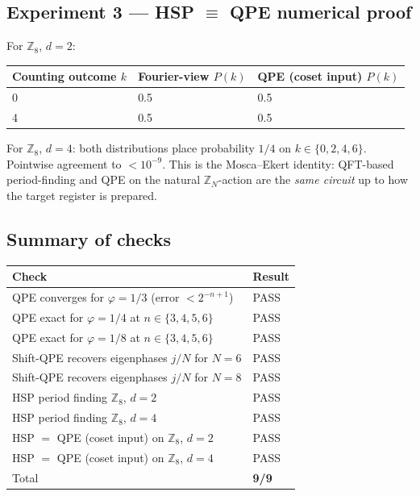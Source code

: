 \documentclass[11pt]{article}
\begin{document}
\subsection{Experiment 3 --- HSP $\equiv$ QPE numerical proof}

For $\mathbb{Z}_8$, $d=2$:
\begin{center}
\begin{tabular}{lll}
\toprule
Counting outcome $k$ & Fourier-view $P(k)$ & QPE (coset input) $P(k)$ \\
\midrule
0 & 0.5 & 0.5 \\
4 & 0.5 & 0.5 \\
\bottomrule
\end{tabular}
\end{center}

For $\mathbb{Z}_8$, $d=4$: both distributions place probability $1/4$ on
$k\in\{0,2,4,6\}$. Pointwise agreement to $<10^{-9}$. This is the
Mosca--Ekert identity: QFT-based period-finding and QPE on the natural
$\mathbb{Z}_N$-action are the \emph{same circuit} up to how the target
register is prepared.

\subsection{Summary of checks}
\begin{center}
\begin{tabular}{ll}
\toprule
Check & Result \\
\midrule
QPE converges for $\varphi=1/3$ (error $<2^{-n+1}$) & PASS \\
QPE exact for $\varphi=1/4$ at $n\in\{3,4,5,6\}$ & PASS \\
QPE exact for $\varphi=1/8$ at $n\in\{3,4,5,6\}$ & PASS \\
Shift-QPE recovers eigenphases $j/N$ for $N=6$ & PASS \\
Shift-QPE recovers eigenphases $j/N$ for $N=8$ & PASS \\
HSP period finding $\mathbb{Z}_8$, $d=2$ & PASS \\
HSP period finding $\mathbb{Z}_8$, $d=4$ & PASS \\
HSP $=$ QPE (coset input) on $\mathbb{Z}_8$, $d=2$ & PASS \\
HSP $=$ QPE (coset input) on $\mathbb{Z}_8$, $d=4$ & PASS \\
\midrule
Total & \textbf{9/9} \\
\bottomrule
\end{tabular}
\end{center}
\end{document}
